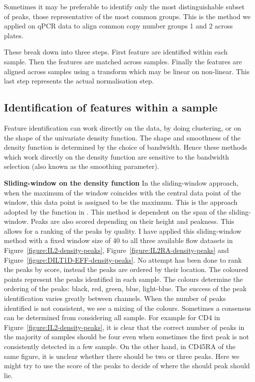 Sometimes it may be preferable to identify only the most distinguishable subset of peaks, those representative of the most common groups.
This is the method we applied on qPCR data to align common copy number groups 1 and 2 across plates.


These break down into three steps.
First feature are identified within each sample.
Then the features are matched across samples.
Finally the features are aligned across samples using a transform which
may be linear on non-linear.
This last step represents the actual normalisation step.

\subsection{Identification of features within a sample}

Feature identification can work directly on the data, by doing clustering,
or on the shape of the univariate density function.  
The shape and smoothness of the density function is determined by the choice of bandwidth.
Hence these methods which work directly on the density function are sensitive to the bandwidth selection (also known as the smoothing parameter).

\textbf{Sliding-window on the density function}
In the sliding-window approach, when the maximum of the window coincides with the central data point of the window, 
this data point is assigned to be the maximum.
This is the approach adopted by the  function in .
This method is dependent on the span of the sliding-window.
Peaks are also scored depending on their height and peakness.
This allows for a ranking of the peaks by quality.
I have applied this sliding-window method with a fixed window size of 40 to all three available flow datasets in Figure~\ref{figure:IL2-density-peaks},
Figure~\ref{figure:IL2RA-density-peaks} and Figure~\ref{figure:DILT1D-EFF-density-peaks}.
No attempt has been done to rank the peaks by score, instead the peaks are ordered by their location.
The coloured points represent the peaks identified in each sample.
The colours determine the ordering of the peaks: black, red, green, blue, light-blue.
The success of the peak identification varies greatly between channels.
When the number of peaks identified is not consistent, we see a mixing of the colours.
Sometimes a consensus can be determined from considering all sample.
For example for CD4 in Figure~\ref{figure:IL2-density-peaks}, it is clear
that the correct number of peaks in the majority of samples should be four even when sometimes the first peak is not consistently detected
in a few sample.
On the other hand, in CD45RA of the same figure, it is unclear whether there should be two or three peaks.
Here we might try to use the score of the peaks to decide of where the should peak should lie.


